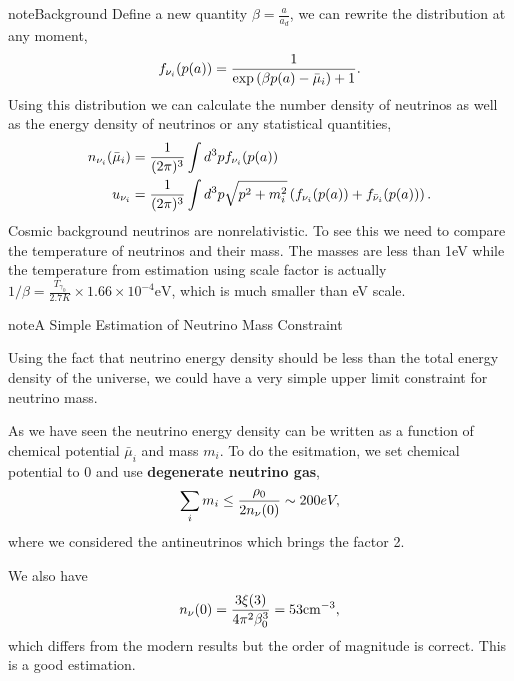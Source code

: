 \documentclass[letterpaper,12pt,english]{sphinxmanual}
\begin{document}
\begin{notice}{note}{Background}
Define a new quantity \(\beta = \frac{a}{a_d}\), we can rewrite the distribution at any moment,
\begin{gather}
\begin{split}f_{\nu_i}(p(a)) = \frac{1}{ \exp\left( \beta p(a) - \bar \mu_i \right) +1 }.\end{split}\notag
\end{gather}
Using this distribution we can calculate the number density of neutrinos as well as the energy density of neutrinos or any statistical quantities,
\begin{gather}
\begin{split}n_{\nu_i} (\bar \mu_i) &= \frac{1}{(2\pi)^3} \int d^3p f_{\nu_i}(p(a)) \\
u_{\nu_i} & = \frac{1}{(2\pi)^3} \int d^3p \sqrt{p^2+m_i^2} \left( f_{\nu_i}(p(a)) + f_{\bar\nu_i}(p(a)) \right).\end{split}\notag
\end{gather}
Cosmic background neutrinos are nonrelativistic. To see this we need to compare the temperature of neutrinos and their mass. The masses are less than 1eV while the temperature from estimation using scale factor is actually \(1/\beta = \frac{T_{\gamma_0}}{2.7K}\times 1.66\times 10^{-4} \mathrm{eV}\), which is much smaller than eV scale. \footnotemark[6]
\end{notice}

\begin{notice}{note}{A Simple Estimation of Neutrino Mass Constraint}

Using the fact that neutrino energy density should be less than the total energy density of the universe, we could have a very simple upper limit constraint for neutrino mass. \footnotemark[6]

As we have seen the neutrino energy density can be written as a function of chemical potential \(\bar\mu_i\) and mass \(m_i\). To do the esitmation, we set chemical potential to 0 and use \textbf{degenerate neutrino gas},
\begin{gather}
\begin{split}\sum_i m_i \leq \frac{\rho_0}{2 n_\nu(0)} \sim 200 eV,\end{split}\notag
\end{gather}
where we considered the antineutrinos which brings the factor 2.

We also have
\begin{gather}
\begin{split}n_\nu(0) = \frac{3\xi(3) }{4\pi^2 \beta_0^3} = 53 \mathrm{cm}^{-3},\end{split}\notag
\end{gather}
which differs from the modern results but the order of magnitude is correct. This is a good estimation.
\end{notice}
\end{document}
